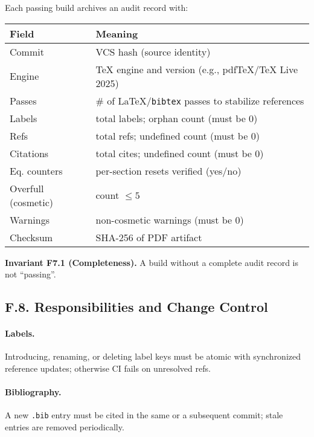 \noindent
Each passing build archives an audit record with:

\begin{center}
\begin{tabular}{ll}
\textbf{Field} & \textbf{Meaning} \\
\hline
Commit & VCS hash (source identity) \\
Engine & TeX engine and version (e.g., pdfTeX/TeX Live 2025) \\
Passes & \# of \LaTeX/\texttt{bibtex} passes to stabilize references \\
Labels & total labels; orphan count (must be $0$) \\
Refs & total refs; undefined count (must be $0$) \\
Citations & total cites; undefined count (must be $0$) \\
Eq. counters & per-section resets verified (yes/no) \\
Overfull (cosmetic) & count $\le 5$ \\
Warnings & non-cosmetic warnings (must be $0$) \\
Checksum & SHA-256 of PDF artifact \\
\end{tabular}
\end{center}

\noindent\textbf{Invariant F7.1 (Completeness).} A build without a complete audit record is not “passing”.


\subsection*{F.8. Responsibilities and Change Control}

\paragraph{Labels.} Introducing, renaming, or deleting label keys must be atomic with synchronized reference updates; otherwise CI fails on unresolved refs.

\paragraph{Bibliography.} A new \texttt{.bib} entry must be cited in the same or a subsequent commit; stale entries are removed periodically.

